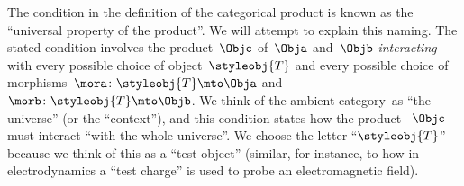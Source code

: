 \begin{remark}
    The condition in the definition of the categorical product is known as the ``universal property of the product''.
    We will attempt to explain this naming.
    The stated condition involves the product~$\Objc$ of~$\Obja$ and~$\Objb$ \emph{interacting} with every possible choice of object~$\styleobj{T}$ and every possible choice of morphisms~$\mora \colon \styleobj{T} \mto \Obja$ and~$\morb\colon \styleobj{T} \mto \Objb$.
    We think of the ambient category~\CatC as ``the universe'' (or the ``context''), and this condition states how the product ~$\Objc$ must interact ``with the whole universe''.
    We choose the letter ``$\styleobj{T}$'' because we think of this as a ``test object'' (similar, for instance,  to how in electrodynamics a ``test charge'' is used to probe an electromagnetic field).
\end{remark}


